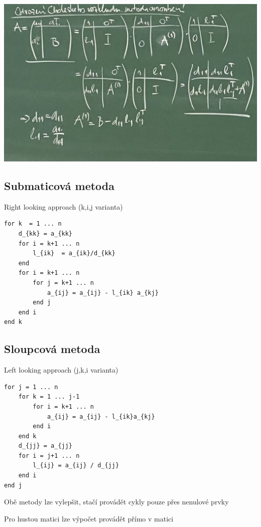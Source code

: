 \documentclass[../main.tex]{subfiles}
\begin{document}
\begin{center}
    \includegraphics[width=0.5\linewidth]{images/12-10-odvozeni.jpg}
\end{center}




\subsection{Submaticová metoda}
Right looking approach (k,i,j varianta)

\begin{minipage}{\linewidth}
\begin{verbatim}
for k  = 1 ... n 
    d_{kk} = a_{kk}
    for i = k+1 ... n
        l_{ik}  = a_{ik}/d_{kk}
    end
    for i = k+1 ... n
        for j = k+1 ... n
            a_{ij} = a_{ij} - l_{ik} a_{kj}
        end j
    end i
end k
\end{verbatim}
\end{minipage}


\subsection{Sloupcová metoda}
Left looking approach (j,k,i varianta)

\begin{minipage}{\linewidth}
\begin{verbatim}
for j = 1 ... n 
    for k = 1 ... j-1
        for i = k+1 ... n
            a_{ij} = a_{ij} - l_{ik}a_{kj}
        end i
    end k
    d_{jj} = a_{jj}
    for i = j+1 ... n
        l_{ij} = a_{ij} / d_{jj}
    end i 
end j
\end{verbatim}    
\end{minipage}


\begin{remark}
    Obě metody lze vylepšit, stačí provádět cykly pouze přes nenulové prvky
\end{remark}

\begin{remark}
    Pro hustou matici lze výpočet provádět přímo v matici \matA 
\end{remark}
\end{document}
